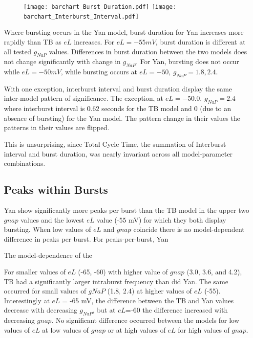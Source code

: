 \documentclass[11pt]{article}
\begin{document}
 \begin{figure}[h]
	\centering
	\texttt{[image: barchart\_Burst\_Duration.pdf]}
	\texttt{[image: barchart\_Interburst\_Interval.pdf]}
	\caption{}
	\label{fig:bcBD}
\end{figure}

Where bursting occurs in the Yan model, burst duration for Yan increases more rapidly than TB as $eL$ increases. For $eL=-55 mV$, burst duration is different at all tested $g_{NaP}$ values.
Differences in burst duration between the two models does not change significantly with change in $g_{NaP}$. For Yan, bursting does not occur while $eL = -50 mV$, while bursting occurs at $eL=-50,\  g_{NaP}=1.8, 2.4$. 

With one exception, interburst interval and burst duration display the same inter-model pattern of significance. The exception, at $eL=-50.0,\ g_{NaP} = 2.4$ where interburst interval is 0.62 seconds for the TB model and 0 (due to an absence of bursting) for the Yan model. 
The pattern change in their values 
the patterns in their values are flipped.

This is unsurprising, since Total Cycle Time, the summation of Interburst interval and burst duration, was nearly invariant across all model-parameter combinations. 

\subsection{Peaks within Bursts}
Yan show significantly more peaks per burst than the TB model in the upper two $gnap$ values and the lowest $eL$ value (-55 mV) for which they both display bursting. When low values of $eL$ and $gnap$ coincide there is no model-dependent difference in peaks per burst.
For peaks-per-burst, Yan 

The model-dependence of the 

For smaller values of $eL$ (-65, -60) with higher value of $gnap$ (3.0, 3.6, and 4.2), TB had a significantly larger intraburst frequency than did Yan. The same occurred for small values of $gNaP$ (1.8, 2.4) at higher values of $eL$ (-55). Interestingly at $eL$ = -65 mV, the difference between the TB and Yan values decrease with decreasing $g_{NaP}$, but at $eL$=-60 the difference increased with decreasing $gnap$. No significant difference occurred between the models for low values of $eL$ at low values of $gnap$ or at high values of $eL$ for high values of $gnap$.
\end{document}
